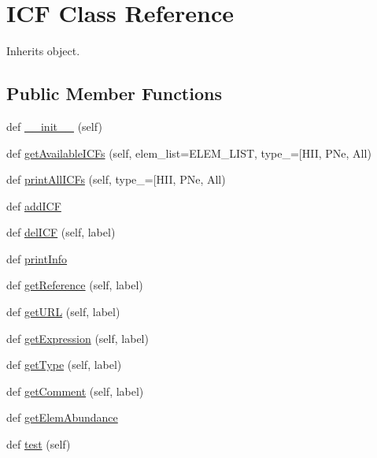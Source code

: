 \hypertarget{classpyneb_1_1core_1_1icf_1_1_i_c_f}{}\section{I\+C\+F Class Reference}
\label{classpyneb_1_1core_1_1icf_1_1_i_c_f}


Inherits object.

\subsection*{Public Member Functions}
\begin{DoxyCompactItemize}
\item 
def \hyperlink{classpyneb_1_1core_1_1icf_1_1_i_c_f_ae64f0875afe3067b97ba370b354b9213}{\+\_\+\+\_\+init\+\_\+\+\_\+} (self)
\item 
def \hyperlink{classpyneb_1_1core_1_1icf_1_1_i_c_f_a9be1eb62f1c3eae47812e16badf8b0b8}{get\+Available\+I\+C\+Fs} (self, elem\+\_\+list=E\+L\+E\+M\+\_\+\+L\+I\+S\+T, type\+\_\+=\mbox{[}\textquotesingle{}H\+I\+I\textquotesingle{}, P\+Ne, All)
\item 
def \hyperlink{classpyneb_1_1core_1_1icf_1_1_i_c_f_afef0a8dae4a6a037e09c2dc4bec22137}{print\+All\+I\+C\+Fs} (self, type\+\_\+=\mbox{[}\textquotesingle{}H\+I\+I\textquotesingle{}, P\+Ne, All)
\item 
def \hyperlink{classpyneb_1_1core_1_1icf_1_1_i_c_f_a626a45156c96e22cb9894b58d492fd0d}{add\+I\+C\+F}
\item 
def \hyperlink{classpyneb_1_1core_1_1icf_1_1_i_c_f_afe603820243b8ce3205e310170fbbd9b}{del\+I\+C\+F} (self, label)
\item 
def \hyperlink{classpyneb_1_1core_1_1icf_1_1_i_c_f_abf1cd85011606ca932f280cafb1274ee}{print\+Info}
\item 
def \hyperlink{classpyneb_1_1core_1_1icf_1_1_i_c_f_a5d0126fd0f1bf7b6c389df1596e8dae6}{get\+Reference} (self, label)
\item 
def \hyperlink{classpyneb_1_1core_1_1icf_1_1_i_c_f_a82da15206e0a626f5c554daab6d3fa9f}{get\+U\+R\+L} (self, label)
\item 
def \hyperlink{classpyneb_1_1core_1_1icf_1_1_i_c_f_a65a29432a67f938e7e9f0dbefaab620f}{get\+Expression} (self, label)
\item 
def \hyperlink{classpyneb_1_1core_1_1icf_1_1_i_c_f_a602e7240cd24164fd01e34551024ee1c}{get\+Type} (self, label)
\item 
def \hyperlink{classpyneb_1_1core_1_1icf_1_1_i_c_f_ac163d51afda239833c0e7e45b9d9cf90}{get\+Comment} (self, label)
\item 
def \hyperlink{classpyneb_1_1core_1_1icf_1_1_i_c_f_a51612cb7c4ec8fcfc8bb46c4aa4f163f}{get\+Elem\+Abundance}
\item 
def \hyperlink{classpyneb_1_1core_1_1icf_1_1_i_c_f_ad66ad6cb69c0206a390b2b1972877f1e}{test} (self)
\end{DoxyCompactItemize}
